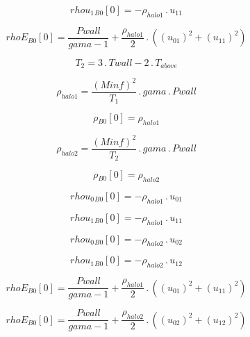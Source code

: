 \documentclass{article}
\begin{document}
\begin{dmath}{rhou_{1}{_{B0}}}[{0}] = - \rho_{halo 1} \,.\, u_{11}\end{dmath}

\begin{dmath}{rhoE{_{B0}}}[{0}] = \frac{Pwall}{gama - 1} + \frac{\rho_{halo 1}}{2} \,.\, \left(\left(u_{01} \right)^{2} + \left(u_{11} \right)^{2}\right)\end{dmath}

\begin{dmath}T_{2} = 3 \,.\, Twall - 2 \,.\, T_{above}\end{dmath}

\begin{dmath}\rho_{halo 1} = \frac{\left(Minf \right)^{2}}{T_{1}} \,.\, gama \,.\, Pwall\end{dmath}

\begin{dmath}{\rho{_{B0}}}[{0}] = \rho_{halo 1}\end{dmath}

\begin{dmath}\rho_{halo 2} = \frac{\left(Minf \right)^{2}}{T_{2}} \,.\, gama \,.\, Pwall\end{dmath}

\begin{dmath}{\rho{_{B0}}}[{0}] = \rho_{halo 2}\end{dmath}

\begin{dmath}{rhou_{0}{_{B0}}}[{0}] = - \rho_{halo 1} \,.\, u_{01}\end{dmath}

\begin{dmath}{rhou_{1}{_{B0}}}[{0}] = - \rho_{halo 1} \,.\, u_{11}\end{dmath}

\begin{dmath}{rhou_{0}{_{B0}}}[{0}] = - \rho_{halo 2} \,.\, u_{02}\end{dmath}

\begin{dmath}{rhou_{1}{_{B0}}}[{0}] = - \rho_{halo 2} \,.\, u_{12}\end{dmath}

\begin{dmath}{rhoE{_{B0}}}[{0}] = \frac{Pwall}{gama - 1} + \frac{\rho_{halo 1}}{2} \,.\, \left(\left(u_{01} \right)^{2} + \left(u_{11} \right)^{2}\right)\end{dmath}

\begin{dmath}{rhoE{_{B0}}}[{0}] = \frac{Pwall}{gama - 1} + \frac{\rho_{halo 2}}{2} \,.\, \left(\left(u_{02} \right)^{2} + \left(u_{12} \right)^{2}\right)\end{dmath}
\end{document}
